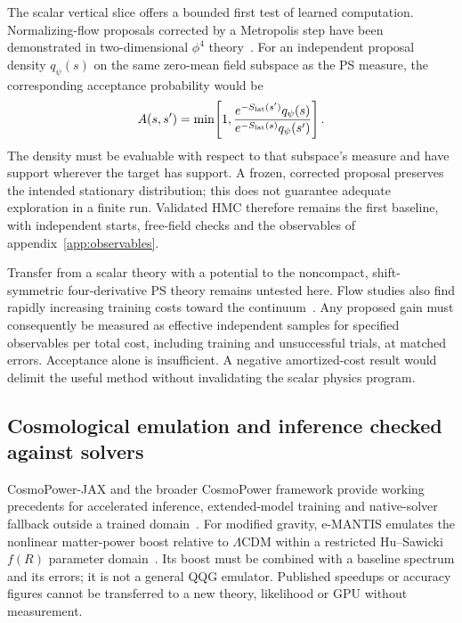 The scalar vertical slice offers a bounded first test of learned computation.  Normalizing-flow proposals corrected by a Metropolis step have been demonstrated in two-dimensional $\phi^4$ theory~\cite{Albergo:2019}.  For an independent proposal density $q_\psi(s)$ on the same zero-mean field subspace as the PS measure, the corresponding acceptance probability would be
\begin{equation}
 A(s,s')=\min\!\left[1,
 \frac{e^{-S_{\rm lat}(s')}q_\psi(s)}
 {e^{-S_{\rm lat}(s)}q_\psi(s')}\right].
\label{eq:learned-ps-proposal}
\end{equation}
The density must be evaluable with respect to that subspace's measure and have support wherever the target has support.  A frozen, corrected proposal preserves the intended stationary distribution; this does not guarantee adequate exploration in a finite run.  Validated HMC therefore remains the first baseline, with independent starts, free-field checks and the observables of appendix~\ref{app:observables}.

Transfer from a scalar theory with a potential to the noncompact, shift-symmetric four-derivative PS theory remains untested here.  Flow studies also find rapidly increasing training costs toward the continuum~\cite{DelDebbio:2021}.  Any proposed gain must consequently be measured as effective independent samples for specified observables per total cost, including training and unsuccessful trials, at matched errors.  Acceptance alone is insufficient.  A negative amortized-cost result would delimit the useful method without invalidating the scalar physics program.

\subsection{Cosmological emulation and inference checked against solvers}

CosmoPower-JAX and the broader CosmoPower framework provide working precedents for accelerated inference, extended-model training and native-solver fallback outside a trained domain~\cite{PirasMancini:2023,Jense:2024}.  For modified gravity, e-MANTIS emulates the nonlinear matter-power boost relative to $\Lambda$CDM within a restricted Hu--Sawicki $f(R)$ parameter domain~\cite{SaezCasares:2023}.  Its boost must be combined with a baseline spectrum and its errors; it is not a general QQG emulator.  Published speedups or accuracy figures cannot be transferred to a new theory, likelihood or GPU without measurement.

